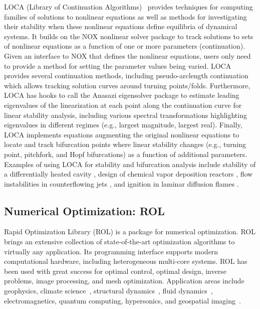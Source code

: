 LOCA (Library of Continuation Algorithms)~\cite{Salinger2005}
provides techniques for computing families of solutions to nonlinear equations as well as methods for investigating their stability when these nonlinear equations define equilibria of dynamical systems.  It builds on the NOX nonlinear solver package to track solutions to sets of nonlinear equations as a function of one or more parameters (continuation).
Given an interface to NOX that defines the nonlinear equations, users only need to provide a method for setting the parameter values being varied.
LOCA provides several continuation methods, including pseudo-arclength continuation which allows tracking solution curves around turning points/folds.  Furthermore, LOCA has hooks to call the Anasazi eigensolver package to estimate leading eigenvalues of the linearization at each point along the continuation curve for linear stability analysis, including various spectral transformations highlighting eigenvalues in different regimes (e.g., largest magnitude, largest real).  Finally, LOCA implements equations augmenting the original nonlinear equations to locate and track bifurcation points where linear stability changes (e.g., turning point, pitchfork, and Hopf bifurcations) as a function of additional parameters. Examples of using LOCA for stability and bifurcation analysis include stability of a differentially heated cavity \cite{Salinger2002}, design of chemical vapor deposition reactors \cite{Pawlowski2001}, flow instabilities in counterflowing jets \cite{pawlowski_salinger_shadid_mountziaris_2006}, and ignition in laminar diffusion flames \cite{Shadid20061846}.

\subsection{Numerical Optimization: ROL}
Rapid Optimization Library (ROL) \cite{rol,ROL2022ICCOPT} is a package for numerical optimization. ROL brings an extensive
collection of state-of-the-art optimization algorithms to virtually
any application.
Its programming interface supports modern computational
hardware, including heterogeneous multi-core systems.
ROL has been used with great success for optimal control, optimal design,
inverse problems, image processing, and mesh optimization. Application areas
include geophysics, climate science~\cite{Perego2022}, structural
dynamics~\cite{AQUINO2019323,BUNTING2021107295}, fluid dynamics~\cite{Antil2023},
electromagnetics, quantum computing, hypersonics, and
geospatial imaging~\cite{Kouri2014}.

